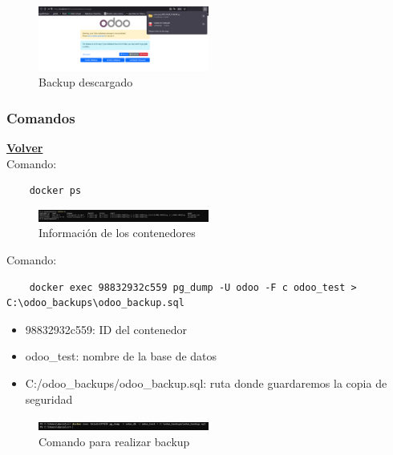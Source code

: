 \documentclass[a4paper,12pt]{article}
\begin{document}
\begin{figure}[h!]
    \centering
    \includegraphics[width=0.5\textwidth]{pr2odoo78-backupInterfazDescargado.png}
    \caption{Backup descargado}
\end{figure}
\FloatBarrier

\subsubsection{Comandos}
\hyperlink{anchor-indice}{\textbf{Volver}}\\

Comando: 
\begin{verbatim}
    docker ps
\end{verbatim}

\begin{figure}[h!]
    \centering
    \includegraphics[width=0.5\textwidth]{pr2odoo79-dockerPS.png}
    \caption{Información de los contenedores}
\end{figure}
\FloatBarrier

Comando: 
\begin{verbatim}
    docker exec 98832932c559 pg_dump -U odoo -F c odoo_test > C:\odoo_backups\odoo_backup.sql 
\end{verbatim}

\begin{itemize}
    \item 98832932c559: ID del contenedor
    \item odoo\_test: nombre de la base de datos
    \item C:/odoo\_backups/odoo\_backup.sql: ruta donde guardaremos la copia de seguridad
\end{itemize}

\begin{figure}[h!]
    \centering
    \includegraphics[width=0.5\textwidth]{pr2odoo80-comandoBackup.png}
    \caption{Comando para realizar backup}
\end{figure}
\FloatBarrier
\end{document}
